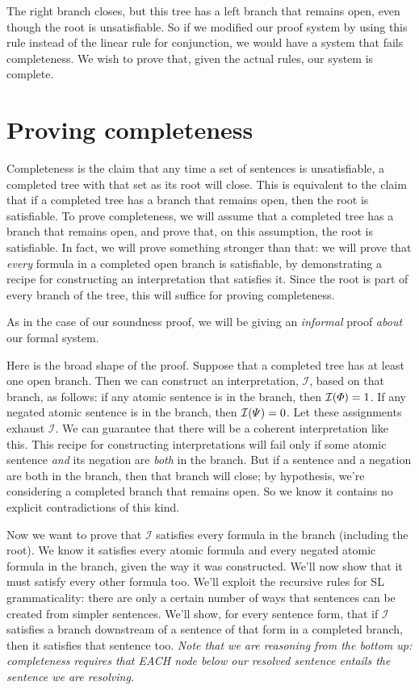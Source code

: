 The right branch closes, but this tree has a left branch that remains open, even though the root is unsatisfiable. So if we modified our proof system by using this rule instead of the linear rule for conjunction, we would have a system that fails completeness. We wish to prove that, given the actual rules, our system is complete.

\section{Proving completeness}
\label{sec.completenessproof}
Completeness is the claim that any time a set of sentences is unsatisfiable, a completed tree with that set as its root will close. This is equivalent to the claim that if a completed tree has a branch that remains open, then the root is satisfiable. To prove completeness, we will assume that a completed tree has a branch that remains open, and prove that, on this assumption, the root is satisfiable. In fact, we will prove something stronger than that: we will prove that \emph{every} formula in a completed open branch is satisfiable, by demonstrating a recipe for constructing an interpretation that satisfies it. Since the root is part of every branch of the tree, this will suffice for proving completeness.

As in the case of our soundness proof, we will be giving an \emph{informal} proof \emph{about} our formal system.

Here is the broad shape of the proof. Suppose that a completed tree has at least one open branch. Then we can construct an interpretation, $\mathcal{I}$, based on that branch, as follows: if any atomic sentence \metaA{} is in the branch, then $\mathcal{I}(\varPhi{})=1$. If any negated atomic sentence \enot\metaB{} is in the branch, then $\mathcal{I}(\varPsi{})=0$. Let these assignments exhaust $\mathcal{I}$. We can guarantee that there will be a coherent interpretation like this. This recipe for constructing interpretations will fail only if some atomic sentence \emph{and} its negation are \emph{both} in the branch. But if a sentence and a negation are both in the branch, then that branch will close; by hypothesis, we're considering a completed branch that remains open. So we know it contains no explicit contradictions of this kind.

Now we want to prove that $\mathcal{I}$ satisfies every formula in the branch (including the root). We know it satisfies every atomic formula and every negated atomic formula in the branch, given the way it was constructed. We'll now show that it must satisfy every other formula too. We'll exploit the recursive rules for SL grammaticality: there are only a certain number of ways that sentences can be created from simpler sentences. We'll show, for every sentence form, that if $\mathcal{I}$ satisfies a branch downstream of a sentence of that form in a completed branch, then it satisfies that sentence too. {\color{black} \textit{Note that we are reasoning from the bottom up: completeness requires that EACH node below our resolved sentence entails the sentence we are resolving.}}

